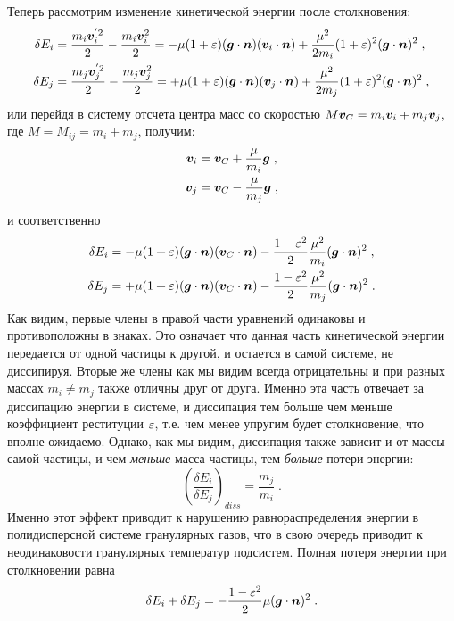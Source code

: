 Теперь рассмотрим изменение кинетической энергии после столкновения:
\begin{equation}
  \begin{split}
    \delta E_i &= \frac{m_i\bm{v}^{'2}_i}{2}-\frac{m_i\bm{v}^2_i}{2} 
    = -\mu(1+\varepsilon)(\bm{g}\cdot\bm{n})(\bm{v}_i\cdot\bm{n})+\frac{\mu^2}{2m_i}(1+\varepsilon)^2(\bm{g}\cdot\bm{n})^2\;, \\
    \delta E_j &= \frac{m_j\bm{v}^{'2}_j}{2}-\frac{m_j\bm{v}^2_j}{2} 
    = +\mu(1+\varepsilon)(\bm{g}\cdot\bm{n})(\bm{v}_j\cdot\bm{n})+\frac{\mu^2}{2m_j}(1+\varepsilon)^2(\bm{g}\cdot\bm{n})^2\;, \\
  \end{split}
\end{equation}
или перейдя в систему отсчета центра масс со скоростью $M\bm{v}_C=m_i\bm{v}_i+m_j\bm{v}_j$, где $M=M_{ij}=m_i+m_j$, получим:
\begin{equation}
  \begin{split}
    \bm{v}_i &= \bm{v}_C + \frac{\mu}{m_i}\bm{g}\;,\\
    \bm{v}_j &= \bm{v}_C - \frac{\mu}{m_j}\bm{g}\;,
  \end{split}
\end{equation}
и соответственно
\begin{equation}\label{eq:delta_E}
  \begin{split}
    \delta E_i &= -\mu(1+\varepsilon)(\bm{g}\cdot\bm{n})(\bm{v}_C\cdot\bm{n})-\frac{1-\varepsilon^2}{2}\frac{\mu^2}{m_i}(\bm{g}\cdot\bm{n})^2\;,\\
    \delta E_j &= +\mu(1+\varepsilon)(\bm{g}\cdot\bm{n})(\bm{v}_C\cdot\bm{n})-\frac{1-\varepsilon^2}{2}\frac{\mu^2}{m_j}(\bm{g}\cdot\bm{n})^2\;.\\
  \end{split}
\end{equation}
Как видим, первые члены в правой части уравнений одинаковы и противоположны в знаках. Это означает что данная часть
кинетической энергии передается от одной частицы к другой, и остается в самой системе, не диссипируя. Вторые же
члены как мы видим всегда отрицательны и при разных массах $m_i\neq m_j$ также отличны друг от друга. Именно эта 
часть отвечает за диссипацию энергии в системе, и диссипация тем больше чем меньше коэффициент реституции $\varepsilon$,
т.е. чем менее упругим будет столкновение, что вполне ожидаемо. Однако, как мы видим, диссипация также зависит
и от массы самой частицы, и чем \emph{меньше} масса частицы, тем \emph{больше} потери энергии:
\begin{equation}
  \left(\frac{\delta E_i}{\delta E_j}\right)_{diss}=\frac{m_j}{m_i}\;.
\end{equation}
Именно этот эффект приводит к нарушению равнораспределения энергии в полидисперсной системе гранулярных газов,
что в свою очередь приводит к неодинаковости гранулярных температур подсистем.
Полная потеря энергии при столкновении равна
\begin{equation}
  \delta E_i+\delta E_j = -\frac{1-\varepsilon^2}{2}\mu(\bm{g}\cdot\bm{n})^2\;.
\end{equation}

